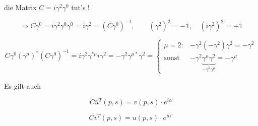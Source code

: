 die Matrix \(C=i\gamma^2\gamma^0\) tut's !

\[\Rightarrow C\gamma^0 = i\gamma^2\gamma^0\gamma^0 = i\gamma^2 = (C\gamma^0)^{-1},\qquad (\gamma^2)^2 = -\mathbb 1, \quad (i\gamma^2)^2 = +\mathbb 1\]

\[C\gamma^0(\gamma^\mu)^*(C\gamma^0)^{-1} = i\gamma^2\gamma^{*\mu}i\gamma^2 = -\gamma^2\gamma^{\mu*}\gamma^2 = \begin{cases}
  \mu = 2:  & -\gamma^2(-\gamma^2)\gamma^2 = -\gamma^2\\
  \text{sonst }&-\gamma^2\underbrace{\gamma^\mu\gamma^2}_{-\gamma^2\gamma^\mu} = -\gamma^\mu
\end{cases}\]

Es gilt auch

\[C\overline u^T (p,s) = v(p,s) \cdot e^{i\alpha}\]

\[C\overline v^T (p,s) = u(p,s) \cdot e^{i\alpha'}\]

